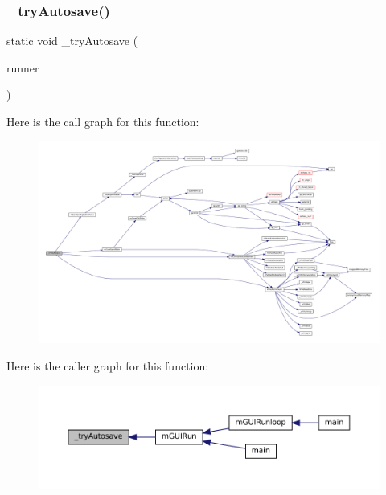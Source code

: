 \subsubsection{\texorpdfstring{\+\_\+try\+Autosave()}{\_tryAutosave()}}
{\footnotesize\ttfamily static void \+\_\+try\+Autosave (\begin{DoxyParamCaption}\item[{struct \mbox{\hyperlink{structm_g_u_i_runner}{m\+G\+U\+I\+Runner}} $\ast$}]{runner }\end{DoxyParamCaption})\hspace{0.3cm}{\ttfamily [static]}}

Here is the call graph for this function\+:
\nopagebreak
\begin{figure}[H]
\begin{center}
\leavevmode
\includegraphics[width=350pt]{gui-runner_8c_a9a5743d49a1e798b2bd55145d96b438d_cgraph}
\end{center}
\end{figure}
Here is the caller graph for this function\+:
\nopagebreak
\begin{figure}[H]
\begin{center}
\leavevmode
\includegraphics[width=350pt]{gui-runner_8c_a9a5743d49a1e798b2bd55145d96b438d_icgraph}
\end{center}
\end{figure}
\mbox{\label{gui-runner_8c_a1a8cb97eac74d065473cb0b7554c72ca}} 
